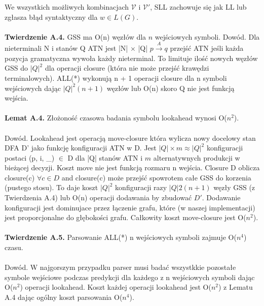 We wszystkich możliwych kombinacjach $\mathcal{V}$ i $\mathcal{V'}$,
SLL zachowuje się jak LL lub zgłasza błąd syntaktyczny dla $w \in L(G)$.
\\ \\
\textbf{Twierdzenie A.4.} GSS ma O(n) węzłów dla $n$ wejściowych symboli.
Dowód. Dla nieterminali N i stanów Q ATN jest |N| $\times$
|Q| $p\overset{A}{\rightarrow}q$ przejść ATN jeśli każda pozycja gramatyczna
wywoła każdy nieterminal. To limituje ilość nowych węzłów GSS
do $|Q|^2$ dla operacji closure (która nie może przejść
krawędzi terminalowych). ALL(*) wykonują n + 1 operacji closure dla n symboli
wejściowych dając $|Q|^2(n + 1)$ węzłów lub O(n) skoro Q nie jest
funkcją wejścia.
\\ \\
\textbf{Lemat A.4.} Złożoność czasowa badania symbolu lookahead wynosi O($n^2$).
\\ \\
Dowód. Lookahead jest operacją move-closure która wylicza
nowy docelowy stan DFA D' jako funkcję konfiguracji ATN
w D. Jest $|Q| \times m \approx |Q|^2$ konfiguracji postaci
(p, i, _) $\in$ D dla |Q| stanów ATN i $m$ alternatywnych
produkcji w bieżącej decyzji. Koszt move nie jest
funkcją rozmaru n wejścia. Closure D oblicza closure(c)
$\forall c \in D$ and closure(c) może przejść spowrotem
całe GSS do korzenia (pustego stosu). To daje koszt $|Q|^2$ konfiguracji
razy $|Q|2(n + 1)$ węzły GSS (z Twierdzenia A.4) lub O(n)
operacji dodawania by zbudować $D'$. Dodawanie konfiguracji jest dominujace
przez łączenie grafu, które (w naszej implementacji) jest proporcjonalne
do głębokości grafu. Całkowity koszt move-closure jest O($n^2$).
\\ \\
\textbf{Twierdzenie A.5.} Parsowanie ALL(*) n wejściowych symboli zajmuje
O($n^4$) czasu.
\\ \\
Dowód. W najgorszym przypadku parser musi badać wszystkkie pozostałe
symbole wejściowe podczas predykcji dla każdego z n wejściowych symboli
dając O($n^2$) operacji lookahead. Koszt każdej operacji lookahead
jest O($n^2$) z Lematu A.4 dając ogólny koszt parsowania O($n^4$).